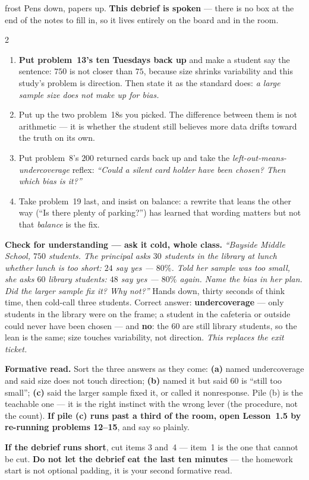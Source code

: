 \documentclass[10pt]{article}
\begin{document}
\boxguard[24]
\begin{skillbox}{frost}
Pens down, papers up. \textbf{This debrief is spoken} --- there is no box at the end of the
notes to fill in, so it lives entirely on the board and in the room.
\begin{multicols}{2}
\begin{enumerate}[leftmargin=1.3em, nosep, itemsep=3pt]
  \item \textbf{Put problem~13's ten Tuesdays back up} and make a student say the sentence: $750$ is
        not closer than $75$, because size shrinks variability and this study's problem is
        direction. Then state it as the standard does: \emph{a large sample size does not make
        up for bias.}
  \item Put up the two problem~18s you picked. The difference between them is
        not arithmetic --- it is whether the student still believes more data drifts toward
        the truth on its own.
  \item Put problem~8's $200$ returned cards back up and take the
        \emph{left-out-means-undercoverage} reflex: \emph{``Could a silent card holder have
        been chosen? Then which bias is it?''}
  \item Take problem~19 last, and insist on balance: a rewrite that leans the other way
        (``Is there plenty of parking?'') has learned that wording matters but not that
        \emph{balance} is the fix.
\end{enumerate}
\columnbreak
\textbf{Check for understanding --- ask it cold, whole class.} \emph{``Bayside Middle School,
$750$ students. The principal asks $30$ students in the library at lunch whether lunch is too
short: $24$ say yes --- $80\%$. Told her sample was too small, she asks $60$ library students:
$48$ say yes --- $80\%$ again. Name the bias in her plan. Did the larger sample fix it? Why
not?''} Hands down, thirty seconds of think time, then cold-call three students. Correct
answer: \textbf{undercoverage} --- only students in the library were on the frame; a student in
the cafeteria or outside could never have been chosen --- and \textbf{no}: the $60$ are still
library students, so the lean is the same; size touches variability, not direction.
\emph{This replaces the exit ticket.}

\textbf{Formative read.} Sort the three answers as they come: \textbf{(a)} named
undercoverage and said size does not touch direction; \textbf{(b)} named it but said $60$ is
``still too small''; \textbf{(c)} said the larger sample fixed it, or called it nonresponse.
Pile (b) is the teachable one --- it is the right instinct with the wrong lever (the procedure,
not the count). \textbf{If pile (c) runs past a third of the room, open Lesson~1.5 by
re-running problems 12--15}, and say so plainly.

\textbf{If the debrief runs short}, cut items 3 and~4 --- item~1 is the one that cannot be
cut. \textbf{Do not let the debrief eat the last ten minutes} --- the homework start is not
optional padding, it is your second formative read.
\end{multicols}
\end{skillbox}
\end{document}
